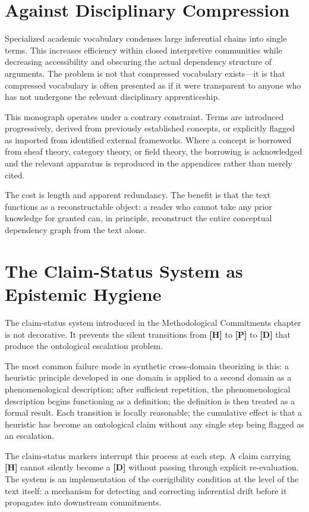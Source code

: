 \section{Against Disciplinary Compression}

Specialized academic vocabulary condenses large inferential chains into single
terms. This increases efficiency within closed interpretive communities while
decreasing accessibility and obscuring the actual dependency structure of
arguments. The problem is not that compressed vocabulary exists---it is that
compressed vocabulary is often presented as if it were transparent to anyone
who has not undergone the relevant disciplinary apprenticeship.

This monograph operates under a contrary constraint. Terms are introduced
progressively, derived from previously established concepts, or explicitly
flagged as imported from identified external frameworks. Where a concept is
borrowed from sheaf theory, category theory, or field theory, the borrowing is
acknowledged and the relevant apparatus is reproduced in the appendices rather
than merely cited.

The cost is length and apparent redundancy. The benefit is that the text
functions as a reconstructable object: a reader who cannot take any prior
knowledge for granted can, in principle, reconstruct the entire conceptual
dependency graph from the text alone.

\section{The Claim-Status System as Epistemic Hygiene}

The claim-status system introduced in the Methodological Commitments chapter is
not decorative. It prevents the silent transitions from \textbf{[H]} to
\textbf{[P]} to \textbf{[D]} that produce the ontological escalation problem.

The most common failure mode in synthetic cross-domain theorizing is this: a
heuristic principle developed in one domain is applied to a second domain as a
phenomenological description; after sufficient repetition, the phenomenological
description begins functioning as a definition; the definition is then treated
as a formal result. Each transition is locally reasonable; the cumulative
effect is that a heuristic has become an ontological claim without any single
step being flagged as an escalation.

The claim-status markers interrupt this process at each step. A claim carrying
\textbf{[H]} cannot silently become a \textbf{[D]} without passing through
explicit re-evaluation. The system is an implementation of the corrigibility
condition at the level of the text itself: a mechanism for detecting and
correcting inferential drift before it propagates into downstream commitments.

